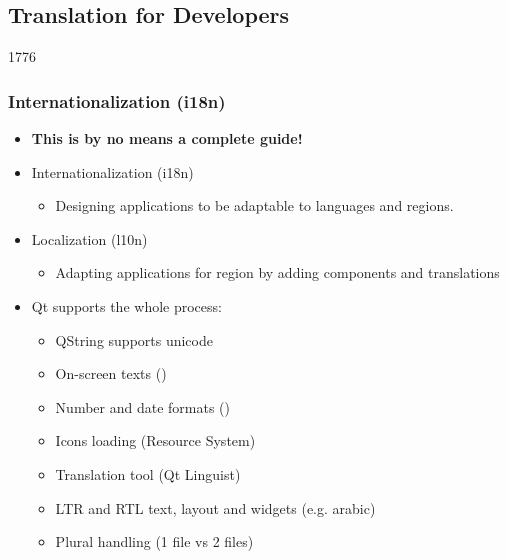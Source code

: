 %
%
%
%

\subsection{Translation for Developers}

\begin{slide}[fragile]{1776} \frametitle{Internationalization (i18n) }
\begin{itemize}
\item \textbf{This is by no means a complete guide!}
\item Internationalization  (i18n)
  \begin{itemize}
  \item Designing applications to be adaptable to languages and regions.
  \end{itemize}
\item Localization (l10n)
  \begin{itemize}
  \item Adapting applications for region by adding components and translations
  \end{itemize}

\item Qt supports the whole process:
  \begin{itemize}
  \item QString supports unicode
  \item On-screen texts ()
  \item Number and date formats ()
  \item Icons loading (Resource System)
  \item Translation tool (Qt Linguist)
  \item LTR and RTL text, layout and widgets (e.g. arabic)
  \item Plural handling (1 file vs 2 files)
  \end{itemize}
\end{itemize}


\end{slide}


